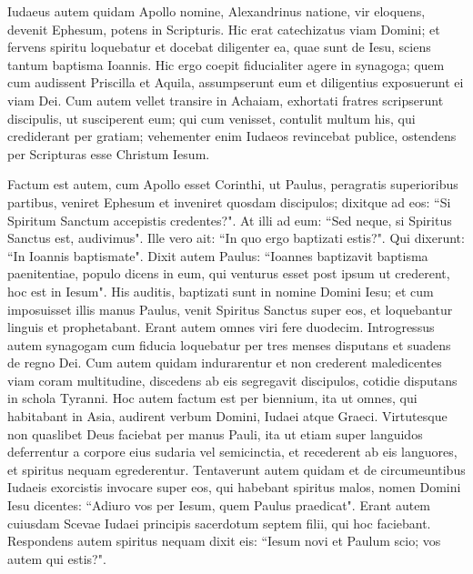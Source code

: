 \begin{biblechapter}
\verse Iudaeus autem quidam Apollo nomine, Alexandrinus natione, vir eloquens, devenit Ephesum, potens in Scripturis. 
\verse Hic erat catechizatus viam Domini; et fervens spiritu loquebatur et docebat diligenter ea, quae sunt de Iesu, sciens tantum baptisma Ioannis. 
\verse Hic ergo coepit fiducialiter agere in synagoga; quem cum audissent Priscilla et Aquila, assumpserunt eum et diligentius exposuerunt ei viam Dei. 
\verse Cum autem vellet transire in Achaiam, exhortati fratres scripserunt discipulis, ut susciperent eum; qui cum venisset, contulit multum his, qui crediderant per gratiam; 
\verse vehementer enim Iudaeos revincebat publice, ostendens per Scripturas esse Christum Iesum. 
\end{biblechapter}

\begin{biblechapter}  
\verse Factum est autem, cum Apollo esset Corinthi, ut Paulus, peragratis superioribus partibus, veniret Ephesum et inveniret quosdam discipulos; 
\verse dixitque ad eos: “Si Spiritum Sanctum accepistis credentes?". At illi ad eum: “Sed neque, si Spiritus Sanctus est, audivimus". 
\verse Ille vero ait: “In quo ergo baptizati estis?". Qui dixerunt: “In Ioannis baptismate". 
\verse Dixit autem Paulus: “Ioannes baptizavit baptisma paenitentiae, populo dicens in eum, qui venturus esset post ipsum ut crederent, hoc est in Iesum". 
\verse His auditis, baptizati sunt in nomine Domini Iesu; 
\verse et cum imposuisset illis manus Paulus, venit Spiritus Sanctus super eos, et loquebantur linguis et prophetabant. 
\verse Erant autem omnes viri fere duodecim. 
\verse Introgressus autem synagogam cum fiducia loquebatur per tres menses disputans et suadens de regno Dei. 
\verse Cum autem quidam indurarentur et non crederent maledicentes viam coram multitudine, discedens ab eis segregavit discipulos, cotidie disputans in schola Tyranni. 
\verse Hoc autem factum est per biennium, ita ut omnes, qui habitabant in Asia, audirent verbum Domini, Iudaei atque Graeci. 
\verse Virtutesque non quaslibet Deus faciebat per manus Pauli, 
\verse ita ut etiam super languidos deferrentur a corpore eius sudaria vel semicinctia, et recederent ab eis languores, et spiritus nequam egrederentur. 
\verse Tentaverunt autem quidam et de circumeuntibus Iudaeis exorcistis invocare super eos, qui habebant spiritus malos, nomen Domini Iesu dicentes: “Adiuro vos per Iesum, quem Paulus praedicat". 
\verse Erant autem cuiusdam Scevae Iudaei principis sacerdotum septem filii, qui hoc faciebant. 
\verse Respondens autem spiritus nequam dixit eis: “Iesum novi et Paulum scio; vos autem qui estis?".  

\end{biblechapter}
